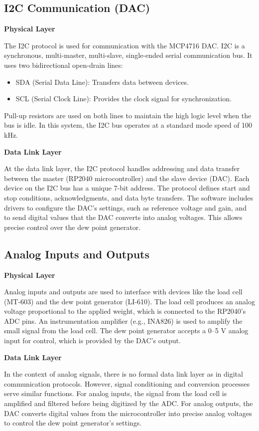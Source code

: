 \subsection{I2C Communication (DAC)}
\textbf{Physical Layer}

The I2C protocol is used for communication with the MCP4716 DAC. I2C is a synchronous, multi-master, multi-slave, single-ended serial communication bus. It uses two bidirectional open-drain lines:
\begin{itemize}
    \item SDA (Serial Data Line): Transfers data between devices.
    \item SCL (Serial Clock Line): Provides the clock signal for synchronization.
\end{itemize}
Pull-up resistors are used on both lines to maintain the high logic level when the bus is idle. In this system, the I2C bus operates at a standard mode speed of 100 kHz.

\textbf{Data Link Layer}

At the data link layer, the I2C protocol handles addressing and data transfer between the master (RP2040 microcontroller) and the slave device (DAC). Each device on the I2C bus has a unique 7-bit address. The protocol defines start and stop conditions, acknowledgments, and data byte transfers. The software includes drivers to configure the DAC's settings, such as reference voltage and gain, and to send digital values that the DAC converts into analog voltages. This allows precise control over the dew point generator.

\subsection{Analog Inputs and Outputs}
\textbf{Physical Layer}

Analog inputs and outputs are used to interface with devices like the load cell (MT-603) and the dew point generator (LI-610). The load cell produces an analog voltage proportional to the applied weight, which is connected to the RP2040's ADC pins. An instrumentation amplifier (e.g., INA826) is used to amplify the small signal from the load cell. The dew point generator accepts a 0–5 V analog input for control, which is provided by the DAC's output.

\textbf{Data Link Layer}

In the context of analog signals, there is no formal data link layer as in digital communication protocols. However, signal conditioning and conversion processes serve similar functions. For analog inputs, the signal from the load cell is amplified and filtered before being digitized by the ADC. For analog outputs, the DAC converts digital values from the microcontroller into precise analog voltages to control the dew point generator's settings.

